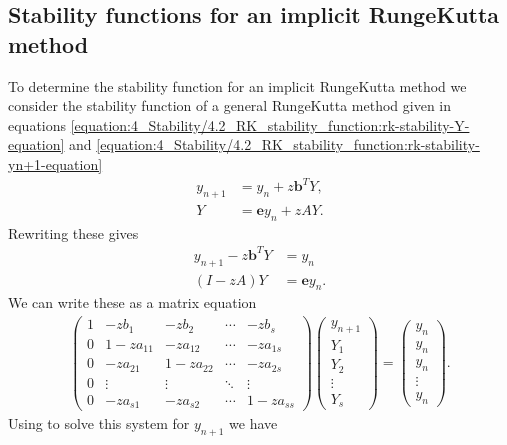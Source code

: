\documentclass[letterpaper,10pt,english]{jupyterBook}
\begin{document}
\subsection{Stability functions for an implicit Runge\sphinxhyphen{}Kutta method}
\label{\detokenize{4_Stability/4.3_IRK_stability_function:stability-functions-for-an-implicit-runge-kutta-method}}
\sphinxAtStartPar
To determine the stability function for an implicit Runge\sphinxhyphen{}Kutta method we consider the stability function of a general Runge\sphinxhyphen{}Kutta method given in equations \eqref{equation:4_Stability/4.2_RK_stability_function:rk-stability-Y-equation} and \eqref{equation:4_Stability/4.2_RK_stability_function:rk-stability-yn+1-equation}
\begin{align*}
    y_{n+1} & = y_n + z \mathbf{b}^T Y, \\
    Y &= \mathbf{e} y_n + z A Y.
\end{align*}
\sphinxAtStartPar
Rewriting these gives
\begin{align*}
    y_{n+1} - z \mathbf{b}^T Y &= y_n \\
    (I - z A) Y &= \mathbf{e}y_n. 
\end{align*}
\sphinxAtStartPar
We can write these as a matrix equation
\begin{align*}
    \begin{pmatrix}
        1 & -z b_1  & -z b_2  & \cdots  & -z b_s \\
        0 & 1-z a_{11}  & -z a_{12}  & \cdots  & -z a_{1s} \\
        0 & -z a_{21}  & 1-z a_{22}  & \cdots  & -z a_{2s} \\
        0 & \vdots  & \vdots  & \ddots  & \vdots \\
        0 & -z a_{s1}  & -z a_{s2}  & \cdots  & 1-z a_{ss} 
    \end{pmatrix}
    \begin{pmatrix} y_{n+1} \\ Y_1 \\ Y_2 \\ \vdots \\ Y_s  \end{pmatrix}=
    \begin{pmatrix} y_n \\ y_n \\ y_n \\ \vdots \\ y_n \end{pmatrix}.
\end{align*}
\sphinxAtStartPar
Using  to solve this system for \(y_{n+1}\) we have
\end{document}
